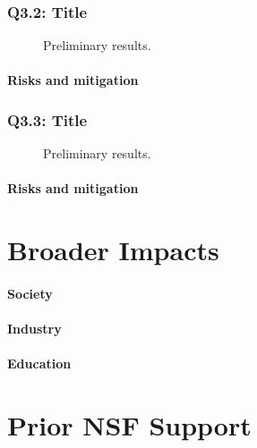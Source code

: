 \documentclass{nsf}
\begin{document}
\subsubsection{Q3.2: Title}
\label{sec:q32}

\begin{wrapfigure}[14]{r}{.5\textwidth}
  \centering
  \caption{Preliminary results.}
  \label{fig:q32fig}
\end{wrapfigure}
\lipsum[1-3]
\paragraph{Risks and mitigation}
\lipsum[4]

\subsubsection{Q3.3: Title}
\label{sec:q33}

\begin{wrapfigure}[14]{r}{.5\textwidth}
  \centering
  \caption{Preliminary results.}
  \label{fig:q33fig}
\end{wrapfigure}
\lipsum[1-3]
\paragraph{Risks and mitigation}
\lipsum[4]

\section{Broader Impacts}
\label{sec:broaderimpacts}

\paragraph{Society}
\lipsum[1]

\paragraph{Industry}
\lipsum[1]

\paragraph{Education}
\lipsum[1]

\section{Prior NSF Support}
\label{sec:priornsfsupport}

\lipsum[1]
\end{document}
